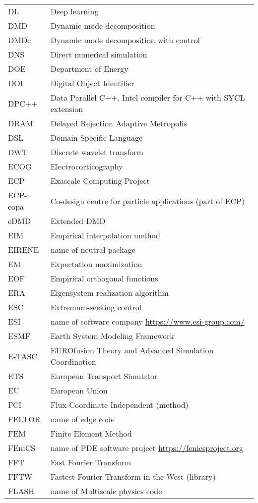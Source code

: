\begin{longtable}{|p{4.0cm}|p{12.0cm}|}
DL  & Deep learning \\
DMD  & Dynamic mode decomposition \\
DMDc  & Dynamic mode decomposition with control \\
DNS  & Direct numerical simulation \\
DOE & Department of Energy \\
DOI & Digital Object Identifier \\
DPC++ & Data Parallel C++, Intel compiler for C++ with SYCL extension \\
DRAM & Delayed Rejection Adaptive Metropolis \\
DSL & Domain-Specific Language \\
DWT  & Discrete wavelet transform \\
ECOG  & Electrocorticography \\
ECP & Exascale Computing Project \\
ECP-copa & Co-design centre for particle applications (part of ECP)\\
eDMD  & Extended DMD \\
EIM  & Empirical interpolation method \\
EIRENE & name of neutral package  \\
EM  & Expectation maximization \\
EOF  & Empirical orthogonal functions \\
ERA  & Eigensystem realization algorithm \\
ESC  & Extremum-seeking control \\
ESI & name of software company \url{https://www.esi-group.com/}  \\
ESMF & Earth System Modeling Framework \\
E-TASC & EUROfusion Theory and Advanced Simulation Coordination \\
ETS & European Transport Simulator\\
EU & European Union \\
FCI & Flux-Coordinate Independent (method) \\
FELTOR & name of edge code \\
FEM & Finite Element Method \\
FEniCS & name of PDE software project \url{https://fenicsproject.org} \\
FFT & Fast Fourier Transform \\
FFTW & Fastest Fourier Transform in the West (library) \\
FLASH & name of Multiscale physics code \\

\end{longtable}
